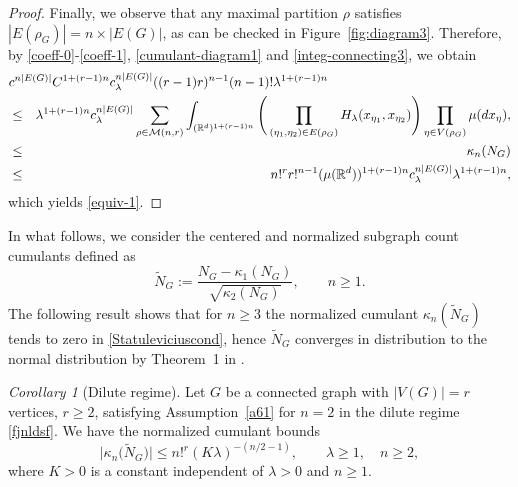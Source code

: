 \documentclass[bj,authoryear,noshowframe]{imsart}
\theoremstyle{plain}
\theoremstyle{remark}
\newcommand{\R}{\mathbb{R}}
\def\real{{\mathord{\mathbb R}}}
\newtheorem{corollary}[prop]{Corollary}
\begin{document}
\begin{proof}
 \vspace{-1cm}
 
 \noindent
  Finally, we observe that any maximal partition $\rho$ satisfies
 $|E(\rho_G)|=n\times|E(G)|$, 
 as can be checked in Figure~\ref{fig:diagram3}.
  Therefore, by %
  \eqref{coeff-0}-\eqref{coeff-1},
  \eqref{cumulant-diagram1} and \eqref{integ-connecting3}, we obtain 
 \begin{eqnarray*} 
   \lefteqn{
     c^{n|E(G)|}
     C^{1+(r-1)n}
     c_\lambda^{n|E(G)|}
     ( (r-1)r )^{n-1}(n-1)!
     \lambda^{1+(r-1)n}
   }
   \\
    & \leq &   
     \lambda^{1+(r-1)n}
         c_\lambda^{n|E(G)|}
   \sum_{\rho\in\mathcal{M}(n,r)}\int_{(\R^d)^{1+(r-1)n}}
   \Bigg(
   \prod_{(\eta_1,\eta_2)\in E(\rho_G)}H_\lambda(x_{\eta_1},x_{\eta_2})
   \Bigg)
   \prod_{\eta\in V(\rho_G)}\mu(dx_{\eta}),
   \\
    & \leq &     \kappa_n(N_G)
       \\
   & \leq & 
   n!^r r!^{n-1} 
   (\mu ( \real^d))^{1+(r-1)n}
   c_\lambda^{n|E(G)|}
  \lambda^{1+(r-1)n}, 
 \end{eqnarray*}
 which yields \eqref{equiv-1}.
 \end{proof}
  In what follows, we consider the centered and normalized subgraph count cumulants defined as 
  $$
  \widetilde{N}_G
  := \frac{N_G - \kappa_1 (N_G)}{\sqrt{\kappa_2(N_G)}}, \qquad n \geq 1. 
 $$
  The following result shows that for $n\geq 3$ the normalized cumulant
  $\kappa_n(\widetilde{N}_G)$ tends to zero in \eqref{Statuleviciuscond},
  hence $\widetilde{N}_G$ converges in distribution to the normal
  distribution by Theorem~1 in \cite{Janson1988}.   
 \begin{corollary}[Dilute regime]
 \label{t1-c}
 Let $G$ be a connected graph with $|V(G)| = r$ vertices, $r\geq 2$, 
 satisfying 
   Assumption~\ref{a61} for $n=2$ in the dilute regime \eqref{fjnldsf}. 
   We have the normalized cumulant bounds 
  \begin{equation}
     \label{Statuleviciuscond}
   \big|\kappa_n \big(\widetilde{N}_G\big)\big|
   \leq n!^r ( K \lambda )^{-(n/2-1)},
   \qquad \lambda \geq 1, \quad n\geq 2,
 \end{equation}
 where $K>0$ is a constant independent of $\lambda >0$ and $n\geq 1$.
 \end{corollary}
\end{document}
